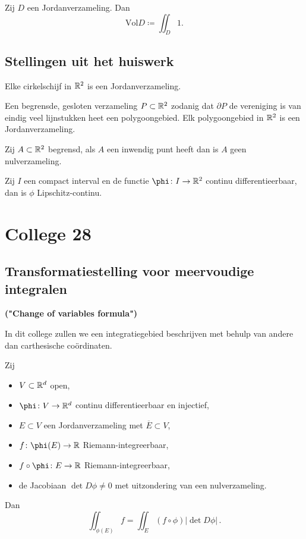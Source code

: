 \documentclass{2wa40summary}
\begin{document}
	    \begin{define}
	    	Zij $D$ een Jordanverzameling. Dan
	    	\[ 
		    	\text{Vol}D \coloneqq  \iint_D 1.
	    	 \]
	    \end{define}
	    
	    \subsection{Stellingen uit het huiswerk}
	    
	    \begin{theorem}
	    	Elke cirkelschijf in $\mathbb{R}^2$ is een Jordanverzameling.
	    \end{theorem}
	    \begin{theorem}
	    	Een begrensde, gesloten verzameling $P \subset \mathbb{R}^2$ zodanig dat $\partial P$ de vereniging is van eindig veel lijnstukken heet een polygoongebied.  
	    	Elk polygoongebied in $\mathbb{R}^2$ is een Jordanverzameling.
	    \end{theorem}
	    \begin{theorem}
	    	Zij $A \subset \mathbb{R}^2$ begrensd, als $A$ een inwendig punt heeft dan is $A$ geen nulverzameling.
	    \end{theorem}
	    \begin{theorem}
	    	Zij $I$ een compact interval en de functie $\phi \: I \to \reals^2$ continu differentieerbaar, dan is $\phi$ Lipschitz-continu.
	    \end{theorem}
	    
	    \newpage
	    \section{College 28}
	    \subsection{Transformatiestelling voor meervoudige integralen}
	    \textbf{("Change of variables formula")}
	    
	    In dit college zullen we een integratiegebied beschrijven met behulp van andere dan carthesische co\"ordinaten.
	    
	    \begin{theorem}
	    	Zij 
	    	\begin{itemize}
		    	\item $V \subset \mathbb{R}^d$ open,
		    	\item $\phi \: V \to \reals^d$ continu differentieerbaar en injectief,
		    	\item $E \subset V$ een Jordanverzameling met $\overline{E} \subset V$,
		    	\item $f \: \phi(E) \to \reals$ Riemann-integreerbaar,
		    	\item $f \circ \phi \: E \to \reals$ Riemann-integreerbaar,
		    	\item de Jacobiaan $\det D\phi \neq 0$ met uitzondering van een nulverzameling.
	    	\end{itemize}
	    	Dan 
	    	\[ 
		    	\iint_{\phi(E)} f = \iint_E (f \circ \phi) |\det D\phi| \,.
	    	 \]
	    \end{theorem}
	    
\end{document}
